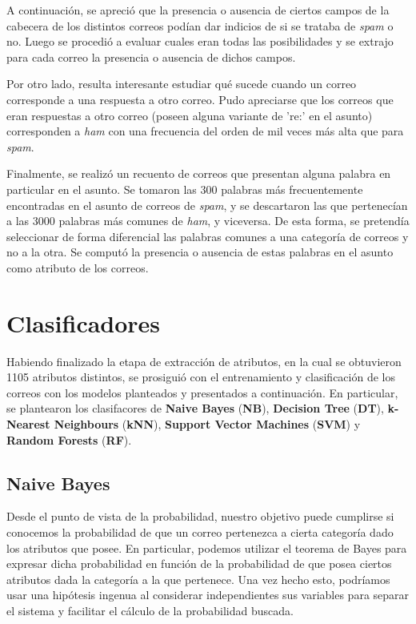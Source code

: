 \documentclass{article}
\begin{document}
A continuación, se apreció que la presencia o ausencia de ciertos campos de la cabecera de los distintos correos podían dar indicios de si se trataba de \textit{spam} o no. Luego se procedió a evaluar cuales eran todas las posibilidades y se extrajo para cada correo la presencia o ausencia de dichos campos.

Por otro lado, resulta interesante estudiar qué sucede cuando un correo corresponde a una respuesta a otro correo. Pudo apreciarse que los correos que eran respuestas a otro correo (poseen alguna variante de 're:' en el asunto) corresponden a \textit{ham} con una frecuencia del orden de mil veces más alta que para \textit{spam}.

Finalmente, se realizó un recuento de correos que presentan alguna palabra en particular en el asunto. Se tomaron las 300 palabras más frecuentemente encontradas en el asunto de correos de \textit{spam}, y se descartaron las que pertenecían a las 3000 palabras más comunes de \textit{ham}, y viceversa. De esta forma, se pretendía seleccionar de forma diferencial las palabras comunes a una categoría de correos y no a la otra. Se computó la presencia o ausencia de estas palabras en el asunto como atributo de los correos.

\section{Clasificadores}

Habiendo finalizado la etapa de extracción de atributos, en la cual se obtuvieron 1105 atributos distintos, se prosiguió con el entrenamiento y clasificación de los correos con los modelos planteados y presentados a continuación. En particular, se plantearon los clasifacores de \textbf{Naive Bayes} (\textbf{NB}), \textbf{Decision Tree} (\textbf{DT}), \textbf{k-Nearest Neighbours} (\textbf{kNN}), \textbf{Support Vector Machines} (\textbf{SVM}) y \textbf{Random Forests} (\textbf{RF}).

\subsection{Naive Bayes}

Desde el punto de vista de la probabilidad, nuestro objetivo puede cumplirse si conocemos la probabilidad de que un correo pertenezca a cierta categoría dado los atributos que posee. En particular, podemos utilizar el teorema de Bayes para expresar dicha probabilidad en función de la probabilidad de que posea ciertos atributos dada la categoría a la que pertenece. Una vez hecho esto, podríamos usar una hipótesis ingenua al considerar independientes sus variables para separar el sistema y facilitar el cálculo de la probabilidad buscada. 
\end{document}
